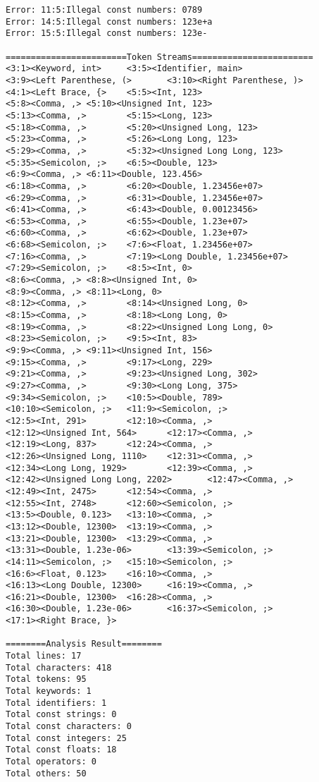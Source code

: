 \documentclass[lang=cn,11pt,a4paper]{paper}
\begin{document}
\begin{lstlisting}
Error: 11:5:Illegal const numbers: 0789
Error: 14:5:Illegal const numbers: 123e+a
Error: 15:5:Illegal const numbers: 123e-

========================Token Streams========================
<3:1><Keyword, int>     <3:5><Identifier, main>
<3:9><Left Parenthese, (>       <3:10><Right Parenthese, )>
<4:1><Left Brace, {>    <5:5><Int, 123>
<5:8><Comma, ,> <5:10><Unsigned Int, 123>
<5:13><Comma, ,>        <5:15><Long, 123>
<5:18><Comma, ,>        <5:20><Unsigned Long, 123>
<5:23><Comma, ,>        <5:26><Long Long, 123>
<5:29><Comma, ,>        <5:32><Unsigned Long Long, 123>
<5:35><Semicolon, ;>    <6:5><Double, 123>
<6:9><Comma, ,> <6:11><Double, 123.456>
<6:18><Comma, ,>        <6:20><Double, 1.23456e+07>
<6:29><Comma, ,>        <6:31><Double, 1.23456e+07>
<6:41><Comma, ,>        <6:43><Double, 0.00123456>
<6:53><Comma, ,>        <6:55><Double, 1.23e+07>
<6:60><Comma, ,>        <6:62><Double, 1.23e+07>
<6:68><Semicolon, ;>    <7:6><Float, 1.23456e+07>
<7:16><Comma, ,>        <7:19><Long Double, 1.23456e+07>
<7:29><Semicolon, ;>    <8:5><Int, 0>
<8:6><Comma, ,> <8:8><Unsigned Int, 0>
<8:9><Comma, ,> <8:11><Long, 0>
<8:12><Comma, ,>        <8:14><Unsigned Long, 0>
<8:15><Comma, ,>        <8:18><Long Long, 0>
<8:19><Comma, ,>        <8:22><Unsigned Long Long, 0>
<8:23><Semicolon, ;>    <9:5><Int, 83>
<9:9><Comma, ,> <9:11><Unsigned Int, 156>
<9:15><Comma, ,>        <9:17><Long, 229>
<9:21><Comma, ,>        <9:23><Unsigned Long, 302>
<9:27><Comma, ,>        <9:30><Long Long, 375>
<9:34><Semicolon, ;>    <10:5><Double, 789>
<10:10><Semicolon, ;>   <11:9><Semicolon, ;>
<12:5><Int, 291>        <12:10><Comma, ,>
<12:12><Unsigned Int, 564>      <12:17><Comma, ,>
<12:19><Long, 837>      <12:24><Comma, ,>
<12:26><Unsigned Long, 1110>    <12:31><Comma, ,>
<12:34><Long Long, 1929>        <12:39><Comma, ,>
<12:42><Unsigned Long Long, 2202>       <12:47><Comma, ,>
<12:49><Int, 2475>      <12:54><Comma, ,>
<12:55><Int, 2748>      <12:60><Semicolon, ;>
<13:5><Double, 0.123>   <13:10><Comma, ,>
<13:12><Double, 12300>  <13:19><Comma, ,>
<13:21><Double, 12300>  <13:29><Comma, ,>
<13:31><Double, 1.23e-06>       <13:39><Semicolon, ;>
<14:11><Semicolon, ;>   <15:10><Semicolon, ;>
<16:6><Float, 0.123>    <16:10><Comma, ,>
<16:13><Long Double, 12300>     <16:19><Comma, ,>
<16:21><Double, 12300>  <16:28><Comma, ,>
<16:30><Double, 1.23e-06>       <16:37><Semicolon, ;>
<17:1><Right Brace, }>

========Analysis Result========
Total lines: 17
Total characters: 418
Total tokens: 95
Total keywords: 1
Total identifiers: 1
Total const strings: 0
Total const characters: 0
Total const integers: 25
Total const floats: 18
Total operators: 0
Total others: 50
\end{lstlisting}
\end{document}
